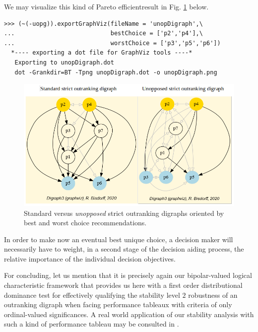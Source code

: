 We may visualize this kind of Pareto efficientresult in Fig. \ref{fig:19.3} below.
\begin{lstlisting}
>>> (~(-uopg)).exportGraphViz(fileName = 'unopDigraph',\
...                           bestChoice = ['p2','p4'],\
...                           worstChoice = ['p3','p5','p6'])
  *---- exporting a dot file for GraphViz tools ----*
   Exporting to unopDigraph.dot
   dot -Grankdir=BT -Tpng unopDigraph.dot -o unopDigraph.png
\end{lstlisting}
\begin{figure}[h]
\includegraphics[width=12cm]{Figures/unopDigraph.png}
\caption{Standard versus \emph{unopposed} strict outranking digraphs oriented by best and worst choice recommendations.} 
\label{fig:19.3}       %
\end{figure}

In order to make now an eventual best unique choice, a decision maker will necessarily have to weight, in a second stage of the decision aiding process, the relative importance of the individual decision objectives.

\vspace{0.5cm}

For concluding, let us mention that it is precisely again our bipolar-valued logical characteristic framework that provides us here with a first order distributional dominance test for effectively qualifying the stability level $2$ robustness of an outranking digraph when facing performance tableaux with criteria of only ordinal-valued significances. A real world application of our stability analysis with such a kind of performance tableau may be consulted in \citep{BIS-2015}.
 
\clearpage


%